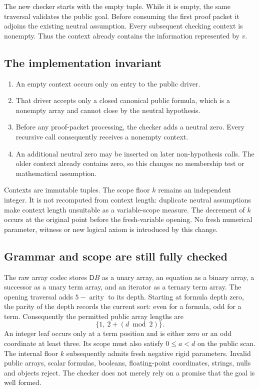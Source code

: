 \documentclass[11pt,a4paper]{article}
\theoremstyle{definition}\newtheorem{definition}[theorem]{Definition}
\theoremstyle{remark}\newtheorem{remark}[theorem]{Remark}
\newcommand{\D}{\mathsf D}
\begin{document}
The new checker starts with the empty tuple. While it is empty, the same
traversal validates the public goal. Before consuming the first proof
packet it adjoins the existing neutral assumption. Every subsequent
checking context is nonempty. Thus the context already contains the
information represented by $v$.

\subsection{The implementation invariant}
\begin{enumerate}
\item An empty context occurs only on entry to the public driver.
\item That driver accepts only a closed canonical public formula, which
is a nonempty array and cannot close by the neutral hypothesis.
\item Before any proof-packet processing, the checker adds a neutral zero.
Every recursive call consequently receives a nonempty context.
\item An additional neutral zero may be inserted on later non-hypothesis
calls. The older context already contains zero, so this changes no
membership test or mathematical assumption.
\end{enumerate}
Contexts are immutable tuples. The scope floor $k$ remains an independent
integer. It is not recomputed from context length: duplicate neutral
assumptions make context length unsuitable as a variable-scope measure.
The decrement of $k$ occurs at the original point before the fresh-variable
opening. No fresh numerical parameter, witness or new logical axiom is
introduced by this change.

\subsection{Grammar and scope are still fully checked}
The raw array codec stores $\D B$ as a unary array, an equation as a
binary array, a successor as a unary term array, and an iterator as a
ternary term array. The opening traversal adds
$5-\operatorname{arity}$ to its depth. Starting at formula depth zero,
the parity of the depth records the current sort: even for a formula,
odd for a term. Consequently the permitted public array lengths are
\[
 \{1,\ 2+(d\bmod 2)\}.
\]
An integer leaf occurs only at a term position and is either zero or an
odd coordinate at least three. Its scope must also satisfy $0\le a<d$
on the public scan. The internal floor $k$ subsequently admits fresh
negative rigid parameters. Invalid public arrays, scalar formulas,
booleans, floating-point coordinates, strings, nulls and objects reject.
The checker does not merely rely on a promise that the goal is well formed.
\end{document}
